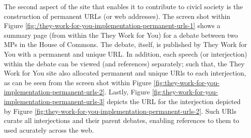 The second aspect of the site that enables it to contribute to civicl society 
is the construction of permanent URLs (or web addresses).
The screen shot within Figure \ref{fig:/they-work-for-you-implementation-permanent-urls-1} shows a summary page (from within the They Work for You) for a debate between two MPs in the House of Commons. 
The debate, itself, is published by They Work for You with a permanent and unique URL.
In addition, each speech (or interjection) within the debate can be viewed (and references) separately; such that, the They Work for You site also allocated permanent and unique URls to each interjection, as can be seen from the screen shot within Figure \ref{fig:they-work-for-you-implementation-permanent-urls-2}.
Lastly, Figure \ref{fig:they-work-for-you-implementation-permanent-urls-3} depicts the URL for the interjection depicted by Figure \ref{fig:they-work-for-you-implementation-permanent-urls-2}.
Such URls curate all interjections and their parent debates, enabling references to them to used acurately across the web.